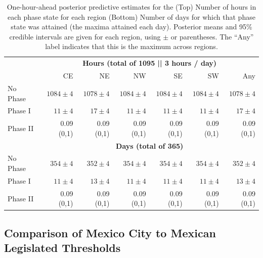 \documentclass[alpha-refs]{wiley-article}
\begin{document}
\begin{table}[H]
\centering
\small
\begin{tabular}{|l|rrrrrr|}
\hline
 &\multicolumn{6}{c|}{ \textbf{Hours (total of 1095 || 3 hours / day) }} \\
 & CE & NE & NW & SE & SW & Any  \\
  \hline
No Phase & $1084 \pm 4$ & $1078 \pm  4$  & $1084 \pm  4$  & $1084 \pm  4$  & $1084 \pm  4$  & $1078 \pm 4$  \\
Phase I & $11 \pm 4$ & $17 \pm 4$ & $11 \pm 4$ & $11 \pm 4$ & $11 \pm 4$ & $17 \pm 4$  \\
Phase II & 0.09 (0,1)& 0.09 (0,1)& 0.09 (0,1)& 0.09 (0,1) & 0.09 (0,1)& 0.09 (0,1)\\
   \hline
 &\multicolumn{6}{c|}{\textbf{Days (total of 365)} } \\
No Phase & $354 \pm 4$ & $352 \pm  4$  & $354 \pm  4$  & $354 \pm  4$  & $354 \pm  4$  & $352 \pm 4$  \\
Phase I & $11 \pm 4$ & $13 \pm 4$ & $11 \pm 4$ & $11 \pm 4$ & $11 \pm 4$ & $13 \pm 4$  \\
Phase II & 0.09 (0,1)& 0.09 (0,1)& 0.09 (0,1)& 0.09 (0,1) & 0.09 (0,1)& 0.09 (0,1)\\
   \hline
\end{tabular}
\caption{One-hour-ahead posterior predictive estimates for the (Top) Number of hours in each phase state for each region (Bottom) Number of days for which that phase state was attained (the maxima attained each day). Posterior means and 95\% credible intervals are given for each region, using $\pm$ or parentheses. The ``Any'' label indicates that this is the maximum across regions. }\label{tab:phase_region}
\end{table}

\subsection{Comparison of Mexico City to Mexican Legislated Thresholds}\label{sec:prospective}
\end{document}
